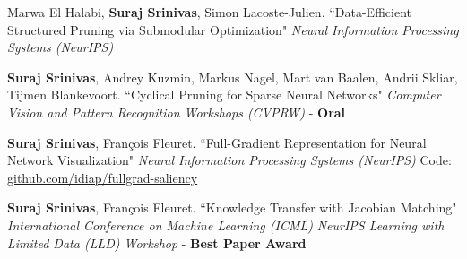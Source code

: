 \documentclass[12pt,a4paper,sans,english]{moderncv}        %
\begin{document}
 {Marwa El Halabi, \textbf{Suraj Srinivas}, Simon Lacoste-Julien.
\newline ``Data-Efficient Structured Pruning via Submodular Optimization" \newline \textit{Neural Information Processing Systems (NeurIPS)}}

\vspace*{0.25em}
 {\textbf{Suraj Srinivas}, Andrey Kuzmin, Markus Nagel, Mart van Baalen, \newline Andrii Skliar, Tijmen Blankevoort. \newline ``Cyclical Pruning for Sparse Neural Networks" 
\newline \textit{Computer Vision and Pattern Recognition Workshops (CVPRW)} - \textbf{Oral}}

\vspace*{0.25em}
\vspace*{0.25em}

 {\textbf{Suraj Srinivas}, Fran\c{c}ois Fleuret. \newline ``Full-Gradient Representation
for Neural Network Visualization" \newline \textit{Neural Information Processing Systems (NeurIPS)}
\newline Code: \href{https://github.com/idiap/fullgrad-saliency}{github.com/idiap/fullgrad-saliency}
}
\vspace*{0.25em}

 {\textbf{Suraj Srinivas}, Fran\c{c}ois Fleuret.
\newline ``Knowledge Transfer with Jacobian Matching" 
\newline \textit{International Conference on Machine Learning (ICML)}
\newline \textit{NeurIPS Learning with Limited Data (LLD) Workshop} - \textbf{Best Paper Award}
}
\vspace*{0.25em}

\end{document}
